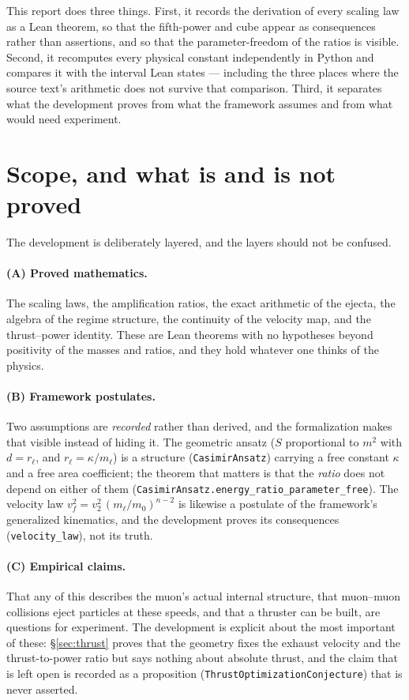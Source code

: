 \documentclass[11pt,a4paper]{article}
\begin{document}
This report does three things.  First, it records the derivation of every
scaling law as a Lean theorem, so that the fifth-power and cube appear as
consequences rather than assertions, and so that the parameter-freedom of the
ratios is visible.  Second, it recomputes every physical constant independently
in Python and compares it with the interval Lean states --- including the three
places where the source text's arithmetic does not survive that comparison.
Third, it separates what the development proves from what the framework assumes
and from what would need experiment.


\section{Scope, and what is and is not proved}
\label{sec:scope}

The development is deliberately layered, and the layers should not be confused.

\paragraph{(A) Proved mathematics.}
The scaling laws, the amplification ratios, the exact arithmetic of the ejecta,
the algebra of the regime structure, the continuity of the velocity map, and the
thrust--power identity.  These are Lean theorems with no hypotheses beyond
positivity of the masses and ratios, and they hold whatever one thinks of the
physics.

\paragraph{(B) Framework postulates.}
Two assumptions are \emph{recorded} rather than derived, and the formalization
makes that visible instead of hiding it.  The geometric ansatz
($S$ proportional to $m^2$ with $d = r_\ell$, and $r_\ell = \kappa/m_\ell$) is a
structure (\texttt{CasimirAnsatz}) carrying a free constant $\kappa$ and a free
area coefficient; the theorem that matters is that the \emph{ratio} does not
depend on either of them
(\texttt{CasimirAnsatz.energy\_ratio\_parameter\_free}).  The velocity law
$v_f^2 = v_2^2\,(m_\ell/m_0)^{n-2}$ is likewise a postulate of the framework's
generalized kinematics, and the development proves its consequences
(\texttt{velocity\_law}), not its truth.

\paragraph{(C) Empirical claims.}
That any of this describes the muon's actual internal structure, that muon--muon
collisions eject particles at these speeds, and that a thruster can be built, are
questions for experiment.  The development is explicit about the most important
of these: \S\ref{sec:thrust} proves that the geometry fixes the exhaust velocity
and the thrust-to-power ratio but says nothing about absolute thrust, and the
claim that is left open is recorded as a proposition
(\texttt{ThrustOptimizationConjecture}) that is never asserted.
\end{document}
